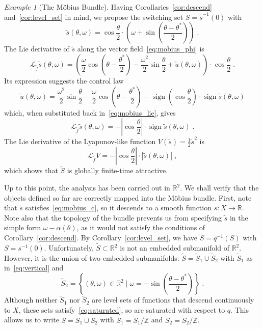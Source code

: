 \documentclass{article}
\theoremstyle{definition}
\theoremstyle{remark}
\newtheorem{example}{Example}
\newcommand{\lie}{\mathcal{L}}	%
\newcommand{\IN}{\mathbb{Z}}	%
\newcommand{\MA}{X}	%
\newcommand{\RR}{\mathbb{R}}	%
\newcommand{\SW}{S}	%
\newcommand{\SWR}{\tilde{S}}	%
\DeclareMathOperator{\sign}{sign}
\begin{document}
\begin{example}[The M\"obius Bundle]
 Having Corollaries~\ref{cor:descend} and~\ref{cor:level_set} in mind, we propose the switching set
 $\SWR = \tilde{s}^{-1}(0)$ with
 \begin{equation} \label{eq:mobius_sigma}
  \tilde{s}(\theta,\omega) = \cos\frac{\theta}{2}\cdot
   \left( \omega + \sin\left(\frac{\theta - \theta^*}{2}\right) \right) \;.
 \end{equation}
 The Lie derivative of $\tilde{s}$ along the vector field~\eqref{eq:mobius_phi} is
 \begin{equation} \label{eq:mobius_lie}
  \lie_{\tilde{f}}\tilde{s}(\theta,\omega) = 
   \left( \frac{\omega}{2}\cos\left(\theta - \frac{\theta^*}{2}\right) - \frac{\omega^2}{2}\sin \frac{\theta}{2} +
    \tilde{u}(\theta,\omega)\right)\cdot \cos \frac{\theta}{2} \;.
 \end{equation}
 Its expression suggests the control law
 \begin{equation} \label{eq:mobius_v}
  \tilde{u}(\theta,\omega) = \frac{\omega^2}{2}\sin \frac{\theta}{2} - \frac{\omega}{2}\cos\left(\theta - \frac{\theta^*}{2}\right)
   - \sign\left( \cos \frac{\theta}{2} \right) \cdot \sign \tilde{s}(\theta,\omega)
 \end{equation}
 which, when substituted back in~\eqref{eq:mobius_lie}, gives
 \begin{equation} \label{eq:mobius_lie2}
  \lie_{\tilde{f}}\tilde{s}(\theta,\omega) = 
   -\left|\cos \frac{\theta}{2} \right| \cdot \sign \tilde{s}(\theta,\omega) \;.
 \end{equation}
 The Lie derivative of the Lyapunov-like function $V(\tilde{s}) = \frac{1}{2}\tilde{s}^2$ is
 \begin{displaymath}
  \lie_{\tilde{f}} V = -\left|\cos \frac{\theta}{2} \right| \cdot |\tilde{s}(\theta,\omega)| \;,
 \end{displaymath}
 which shows that $\SWR$ is globally finite-time attractive.

 Up to this point, the analysis has been carried out in $\RR^2$. We shall verify that the objects defined so far
 are correctly mapped into the M\"obius bundle. First, note that $\tilde{s}$ satisfies~\eqref{eq:mobius_c}, so
 it descends to a smooth function $s : \MA \to \RR$. Note also that the topology of the bundle prevents us from 
 specifying $\tilde{s}$ in the simple form $\omega - \alpha(\theta)$, as it would not satisfy the conditions of 
 Corollary~\ref{cor:descend}. By Corollary~\ref{cor:level_set}, we have $\SWR = q^{-1}(\SW)$ with $\SW = s^{-1}(0)$. Unfortunately, 
 $\SWR \subset \RR^2$ is not an embedded submanifold of $\RR^2$. However, it is the union of two embedded submanifolds: $\SWR = \SWR_1 \cup \SWR_2$ 
 with $\SWR_1$ as in~\eqref{eq:vertical} and
 \begin{displaymath}
  \SWR_2 = \left\{ (\theta,\omega) \in \RR^2 \mid \omega = -\sin\left( \frac{\theta-\theta^*}{2} \right) \right\} \;.
 \end{displaymath}
 Although neither $\SWR_1$ nor $\SWR_2$ are level sets of functions that descend continuously to $\MA$, these sets
 satisfy~\eqref{eq:saturated}, so are saturated with respect to $q$. This allows us to write $\SW = \SW_1 \cup \SW_2$ with 
 $\SW_1 = \SWR_1/\IN$ and $\SW_2 = \SWR_2/\IN$.


\end{example}
\end{document}
